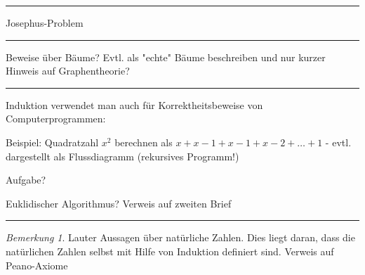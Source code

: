 \documentclass[a4paper,ngerman,12pt]{scrartcl}
\theoremstyle{definition}
\theoremstyle{plain}
\theoremstyle{remark}
\newtheorem{bem}[defn]{Bemerkung}
\begin{document}
\hrule

Josephus-Problem

\hrule

Beweise über Bäume? Evtl. als "echte" Bäume beschreiben und nur kurzer Hinweis auf Graphentheorie?

\hrule

Induktion verwendet man auch für Korrektheitsbeweise von Computerprogrammen:

Beispiel: Quadratzahl $x^2$ berechnen als $x+x-1 +x-1+x-2 + \dots +1$ - evtl. dargestellt als Flussdiagramm (rekursives Programm!)

Aufgabe?

Euklidischer Algorithmus? Verweis auf zweiten Brief

\hrule

\begin{bem}
Lauter Aussagen über natürliche Zahlen. Dies liegt daran, dass die natürlichen Zahlen selbst mit Hilfe von Induktion definiert sind. Verweis auf Peano-Axiome
\end{bem}
\end{document}
